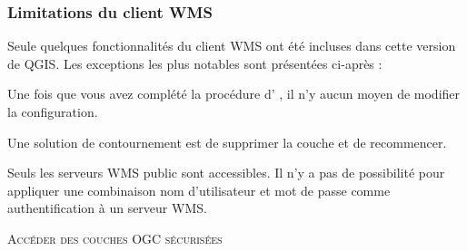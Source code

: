 \subsubsection{Limitations du client
WMS}\label{sec:ogc-wms-limits}

Seule quelques fonctionnalités du client WMS ont été incluses dans cette
version de QGIS. Les exceptions les plus notables sont présentées ci-après :


Une fois que vous avez complété la procédure d'
, il n'y aucun moyen
de modifier la configuration.

Une solution de contournement est de supprimer la couche et de recommencer.


Seuls les serveurs WMS public sont accessibles.
Il n'y a pas de possibilité pour appliquer une combinaison nom d'utilisateur
et mot de passe comme authentification à un serveur WMS.

\begin{Tip}[ht]\caption{\textsc{Accéder des couches OGC sécurisées}}
\end{Tip}


